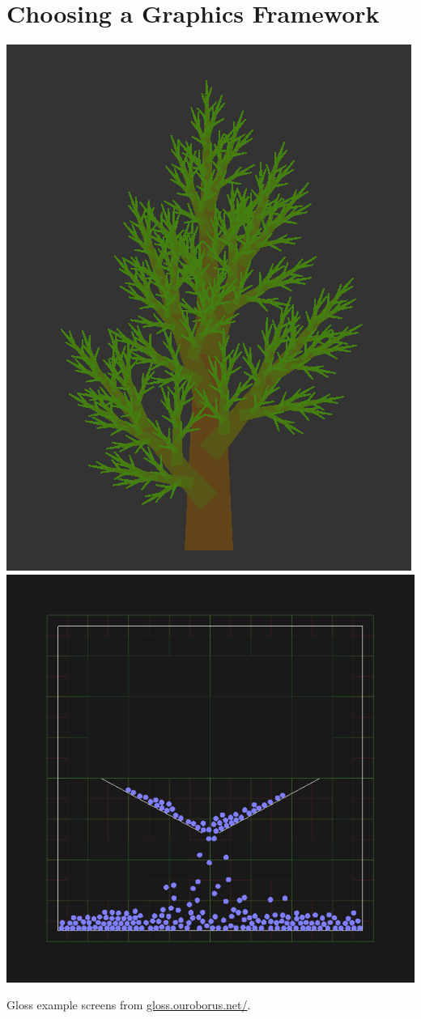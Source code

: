 \section{Choosing a Graphics Framework}


\begin{marginfigure}
	\includegraphics{res/gloss/gloss-tree.png}
	\vspace{1em}
	\includegraphics{res/gloss/gloss-styrene.png}
	\caption[Gloss example screens.]{Gloss example screens from \url{gloss.ouroborus.net/}.}
	\label{fig:gloss}
\end{marginfigure}

\lipsum[1]